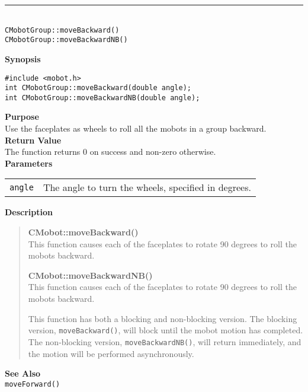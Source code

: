 \noindent
\vspace{5pt}
\rule{4.5in}{0.015in}\\
\noindent
{\LARGE \texttt{CMobotGroup::moveBackward()}}\\
{\LARGE \texttt{CMobotGroup::moveBackwardNB()}}\\
{}

\noindent
{\bf Synopsis}
\vspace{-8pt}
\begin{verbatim}
#include <mobot.h>
int CMobotGroup::moveBackward(double angle);
int CMobotGroup::moveBackwardNB(double angle);
\end{verbatim}

\noindent
{\bf Purpose}\\
Use the faceplates as wheels to roll all the mobots in a group backward.\\

\noindent
{\bf Return Value}\\
The function returns 0 on success and non-zero otherwise.\\

\noindent
{\bf Parameters}\\
\vspace{-0.1in}
\begin{description}
\item               
\begin{tabular}{p{15 mm}p{145 mm}}
\texttt{angle} & The angle to turn the wheels, specified in degrees.\\
\end{tabular}
\end{description}

\noindent
{\bf Description}\\
\vspace{-12pt}
\begin{quote}
{\bf CMobot::moveBackward()}\\
This function causes each of the faceplates to rotate 90 degrees to roll the
mobots backward.

{\bf CMobot::moveBackwardNB()}\\
This function causes each of the faceplates to rotate 90 degrees to roll the
mobots backward.

This function has both a blocking and non-blocking version.
The blocking version, \texttt{moveBackward()}, will block until the
mobot motion has completed. The non-blocking version, \texttt{moveBackwardNB()},
will return immediately, and the motion will be performed asynchronously.\\
\end{quote}

\noindent
{\bf See Also}\\
\texttt{moveForward()}


